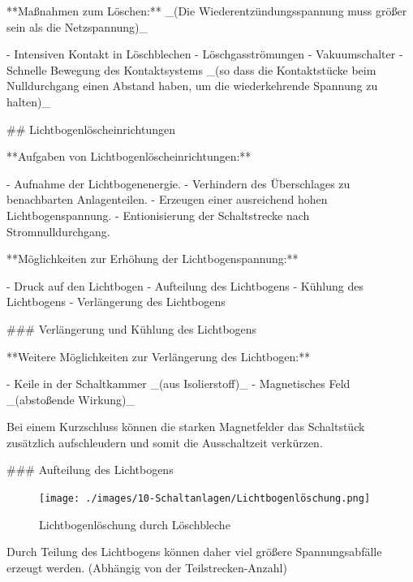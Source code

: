 \begin{markdown}
**Maßnahmen zum Löschen:** _(Die Wiederentzündungsspannung muss größer sein als die Netzspannung)_

- Intensiven Kontakt in Löschblechen
- Löschgasströmungen
- Vakuumschalter
- Schnelle Bewegung des Kontaktsystems _(so dass die Kontaktstücke beim Nulldurchgang einen Abstand haben, um die wiederkehrende Spannung zu halten)_

\vspace{3em}

## Lichtbogenlöscheinrichtungen

**Aufgaben von Lichtbogenlöscheinrichtungen:**

- Aufnahme der Lichtbogenenergie.
- Verhindern des Überschlages zu benachbarten Anlagenteilen.
- Erzeugen einer ausreichend hohen Lichtbogenspannung.
- Entionisierung der Schaltstrecke nach Stromnulldurchgang.

**Möglichkeiten zur Erhöhung der Lichtbogenspannung:**

- Druck auf den Lichtbogen
- Aufteilung des Lichtbogens
- Kühlung des Lichtbogens
- Verlängerung des Lichtbogens

### Verlängerung und Kühlung des Lichtbogens


**Weitere Möglichkeiten zur Verlängerung des Lichtbogen:**

- Keile in der Schaltkammer _(aus Isolierstoff)_
- Magnetisches Feld _(abstoßende Wirkung)_

Bei einem Kurzschluss können die starken Magnetfelder das Schaltstück zusätzlich aufschleudern und somit die Ausschaltzeit verkürzen.

\newpage

### Aufteilung des Lichtbogens


\begin{figure}
    \vspace{-1em}
    \centering
    \texttt{[image: ./images/10-Schaltanlagen/Lichtbogenlöschung.png]}
    \caption[Lichtbogenlöschung durch Löschbleche]{Lichtbogenlöschung durch Löschbleche}
\end{figure}

Durch Teilung des Lichtbogens können daher viel größere Spannungsabfälle erzeugt werden. (Abhängig von der Teilstrecken-Anzahl)


\end{markdown}
